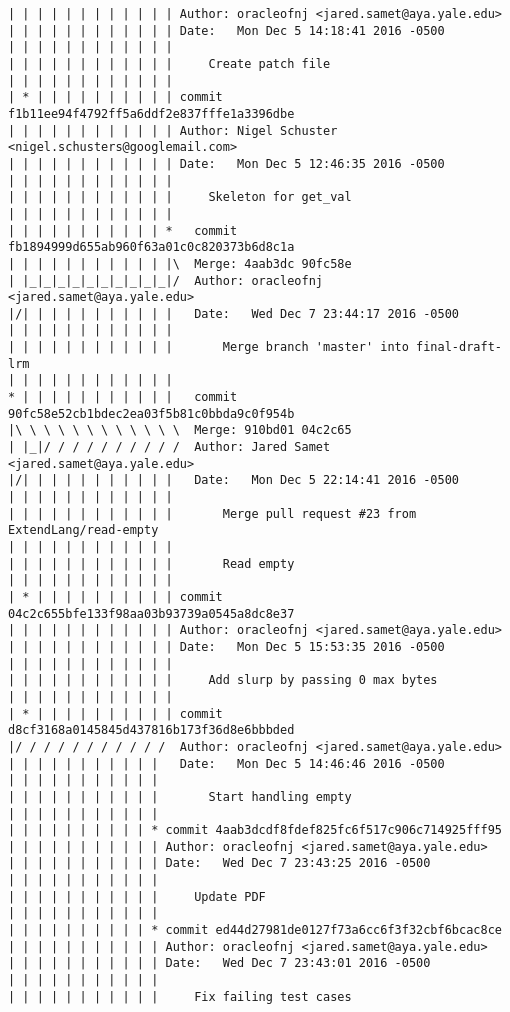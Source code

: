 \begin{lstlisting}
| | | | | | | | | | | | Author: oracleofnj <jared.samet@aya.yale.edu>
| | | | | | | | | | | | Date:   Mon Dec 5 14:18:41 2016 -0500
| | | | | | | | | | | | 
| | | | | | | | | | | |     Create patch file
| | | | | | | | | | | |             
| * | | | | | | | | | | commit f1b11ee94f4792ff5a6ddf2e837fffe1a3396dbe
| | | | | | | | | | | | Author: Nigel Schuster <nigel.schusters@googlemail.com>
| | | | | | | | | | | | Date:   Mon Dec 5 12:46:35 2016 -0500
| | | | | | | | | | | | 
| | | | | | | | | | | |     Skeleton for get_val
| | | | | | | | | | | |               
| | | | | | | | | | | *   commit fb1894999d655ab960f63a01c0c820373b6d8c1a
| | | | | | | | | | | |\  Merge: 4aab3dc 90fc58e
| |_|_|_|_|_|_|_|_|_|_|/  Author: oracleofnj <jared.samet@aya.yale.edu>
|/| | | | | | | | | | |   Date:   Wed Dec 7 23:44:17 2016 -0500
| | | | | | | | | | | |   
| | | | | | | | | | | |       Merge branch 'master' into final-draft-lrm
| | | | | | | | | | | |               
* | | | | | | | | | | |   commit 90fc58e52cb1bdec2ea03f5b81c0bbda9c0f954b
|\ \ \ \ \ \ \ \ \ \ \ \  Merge: 910bd01 04c2c65
| |_|/ / / / / / / / / /  Author: Jared Samet <jared.samet@aya.yale.edu>
|/| | | | | | | | | | |   Date:   Mon Dec 5 22:14:41 2016 -0500
| | | | | | | | | | | |   
| | | | | | | | | | | |       Merge pull request #23 from ExtendLang/read-empty
| | | | | | | | | | | |       
| | | | | | | | | | | |       Read empty
| | | | | | | | | | | |             
| * | | | | | | | | | | commit 04c2c655bfe133f98aa03b93739a0545a8dc8e37
| | | | | | | | | | | | Author: oracleofnj <jared.samet@aya.yale.edu>
| | | | | | | | | | | | Date:   Mon Dec 5 15:53:35 2016 -0500
| | | | | | | | | | | | 
| | | | | | | | | | | |     Add slurp by passing 0 max bytes
| | | | | | | | | | | |             
| * | | | | | | | | | | commit d8cf3168a0145845d437816b173f36d8e6bbbded
|/ / / / / / / / / / /  Author: oracleofnj <jared.samet@aya.yale.edu>
| | | | | | | | | | |   Date:   Mon Dec 5 14:46:46 2016 -0500
| | | | | | | | | | |   
| | | | | | | | | | |       Start handling empty
| | | | | | | | | | |            
| | | | | | | | | | * commit 4aab3dcdf8fdef825fc6f517c906c714925fff95
| | | | | | | | | | | Author: oracleofnj <jared.samet@aya.yale.edu>
| | | | | | | | | | | Date:   Wed Dec 7 23:43:25 2016 -0500
| | | | | | | | | | | 
| | | | | | | | | | |     Update PDF
| | | | | | | | | | |            
| | | | | | | | | | * commit ed44d27981de0127f73a6cc6f3f32cbf6bcac8ce
| | | | | | | | | | | Author: oracleofnj <jared.samet@aya.yale.edu>
| | | | | | | | | | | Date:   Wed Dec 7 23:43:01 2016 -0500
| | | | | | | | | | | 
| | | | | | | | | | |     Fix failing test cases

\end{lstlisting}

